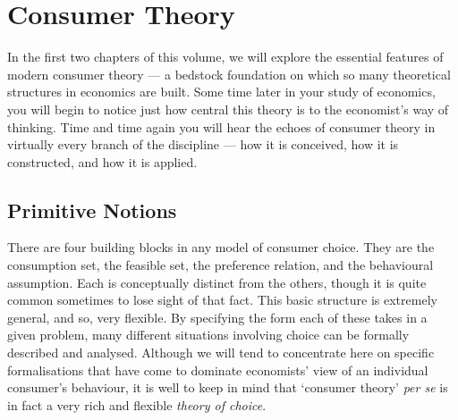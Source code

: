 \documentclass[b5paper]{memoir}
\begin{document}
\thispagestyle{titlingpage}
\clearpage

\mainmatter

\pagestyle{MEst}

\chapter{Consumer Theory}

In the first two chapters of this volume, we will explore the essential features of modern
consumer theory --- a bedstock foundation on which so many theoretical structures in
economics are built. Some time later in your study of economics, you will begin to notice
just how central this theory is to the economist’s way of thinking. Time and time again
you will hear the echoes of consumer theory in virtually every branch of the discipline 
--- how it is conceived, how it is constructed, and how it is applied.

\section{Primitive Notions}

There are four building blocks in any model of consumer choice. 
They are the consumption set, the feasible set, the preference relation, and the behavioural assumption. 
Each is conceptually distinct from the others, though it is quite common sometimes to lose sight
of that fact. This basic structure is extremely general, and so, very flexible. By
specifying the form each of these takes in a given problem, many different situations
involving choice can be formally described and analysed. Although we will tend to
concentrate here on specific formalisations that have come to dominate economists’ view of
an individual consumer’s behaviour, it is well to keep in mind that ‘consumer theory’
\emph{per se} is in fact a very rich and flexible \emph{theory of choice}.
\end{document}
